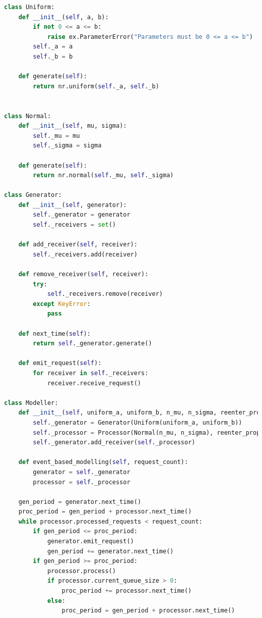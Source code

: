 \documentclass[a4paper, 12pt]{article}
\begin{document}

\lstset{style=mystyle}

\begin{lstlisting}[language=Python, caption = Программная реализация обслуживающего аппарата]
class Uniform:
	def __init__(self, a, b):
		if not 0 <= a <= b:
			raise ex.ParameterError("Parameters must be 0 <= a <= b")
		self._a = a
		self._b = b

	def generate(self):
		return nr.uniform(self._a, self._b)


class Normal:
	def __init__(self, mu, sigma):
		self._mu = mu
		self._sigma = sigma

	def generate(self):
		return nr.normal(self._mu, self._sigma)
		
class Generator:
	def __init__(self, generator):
		self._generator = generator
		self._receivers = set()
	
	def add_receiver(self, receiver):
		self._receivers.add(receiver)
	
	def remove_receiver(self, receiver):
		try:
			self._receivers.remove(receiver)
		except KeyError:
			pass
	
	def next_time(self):
		return self._generator.generate()
	
	def emit_request(self):
		for receiver in self._receivers:
			receiver.receive_request()
			
class Modeller:
	def __init__(self, uniform_a, uniform_b, n_mu, n_sigma, reenter_prop):
		self._generator = Generator(Uniform(uniform_a, uniform_b))
		self._processor = Processor(Normal(n_mu, n_sigma), reenter_prop)
		self._generator.add_receiver(self._processor)

	def event_based_modelling(self, request_count):
		generator = self._generator
		processor = self._processor

	gen_period = generator.next_time()
	proc_period = gen_period + processor.next_time()
	while processor.processed_requests < request_count:
		if gen_period <= proc_period:
			generator.emit_request()
			gen_period += generator.next_time()
		if gen_period >= proc_period:
			processor.process()
			if processor.current_queue_size > 0:
				proc_period += processor.next_time()
			else:
				proc_period = gen_period + processor.next_time()


\end{lstlisting}
\end{document}
